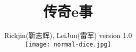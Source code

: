 %
\hypersetup{CJKbookmarks=true}
\title{\Huge \youyuan \textbf{传奇e事}}
\author{\youyuan Rickjin(靳志辉), LeiJun(雷军) version 1.0 \\
\texttt{[image: normal-dice.jpg]}
}

\maketitle
\tableofcontents


